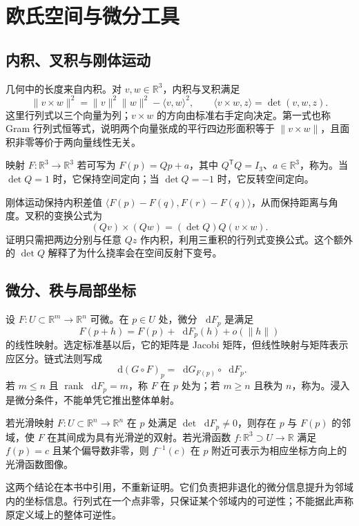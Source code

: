 \documentclass[UTF8,12pt,a4paper,fontset=fandol]{ctexbook}
\newcommand{\R}{\mathbb R}
\newcommand{\dd}{\mathop{}\!\mathrm d}
\newcommand{\ip}[2]{\langle #1,#2\rangle}
\newcommand{\norm}[1]{\lVert #1\rVert}
\DeclareMathOperator{\rank}{rank}
\begin{document}
\mainmatter

\chapter{欧氏空间与微分工具}
\label{chap:dg-tools}

\section{内积、叉积与刚体运动}
几何中的长度来自内积。对 $v,w\in\R^3$，内积与叉积满足
\[
 \norm{v\times w}^2=\norm v^2\norm w^2-\ip vw^2,
 \qquad \ip{v\times w}{z}=\det(v,w,z).
\]
这里行列式以三个向量为列；$v\times w$ 的方向由标准右手定向决定。第一式也称 Gram 行列式恒等式，说明两个向量张成的平行四边形面积等于 $\norm{v\times w}$，且面积非零等价于两向量线性无关。

\begin{definition}[欧氏刚体运动]
映射 $F:\R^3\to\R^3$ 若可写为 $F(p)=Qp+a$，其中 $Q^{\mathsf T}Q=I_3$、$a\in\R^3$，称为。当 $\det Q=1$ 时，它保持空间定向；当 $\det Q=-1$ 时，它反转空间定向。
\end{definition}
刚体运动保持内积差值 $\ip{F(p)-F(q)}{F(r)-F(q)}$，从而保持距离与角度。叉积的变换公式为
\[
 (Qv)\times(Qw)=(\det Q)Q(v\times w).
\]
证明只需把两边分别与任意 $Qz$ 作内积，利用三重积的行列式变换公式。这个额外的 $\det Q$ 解释了为什么挠率会在空间反射下变号。

\section{微分、秩与局部坐标}
设 $F:U\subset\R^m\to\R^n$ 可微。在 $p\in U$ 处，微分 $\dd F_p$ 是满足
\[
 F(p+h)=F(p)+\dd F_p(h)+o(\norm h)
\]
的线性映射。选定标准基以后，它的矩阵是 Jacobi 矩阵，但线性映射与矩阵表示应区分。链式法则写成
\begin{equation}
 \dd(G\circ F)_p=\dd G_{F(p)}\circ\dd F_p.
 \label{eq:dg-chain}
\end{equation}
若 $m\le n$ 且 $\rank\dd F_p=m$，称 $F$ 在 $p$ 处为；若 $m\ge n$ 且秩为 $n$，称为。浸入是微分条件，不能单凭它推出整体单射。

\begin{theorem}
若光滑映射 $F:U\subset\R^n\to\R^n$ 在 $p$ 处满足 $\det\dd F_p\ne0$，则存在 $p$ 与 $F(p)$ 的邻域，使 $F$ 在其间成为具有光滑逆的双射。若光滑函数 $f:\R^3\supset U\to\R$ 满足 $f(p)=c$ 且某个偏导数非零，则 $f^{-1}(c)$ 在 $p$ 附近可表示为相应坐标方向上的光滑函数图像。
\label{thm:dg-ift}
\end{theorem}
这两个结论在本书中引用，不重新证明。它们负责把非退化的微分信息提升为邻域内的坐标信息。行列式在一个点非零，只保证某个邻域内的可逆性；不能据此声称原定义域上的整体可逆性。
\end{document}
